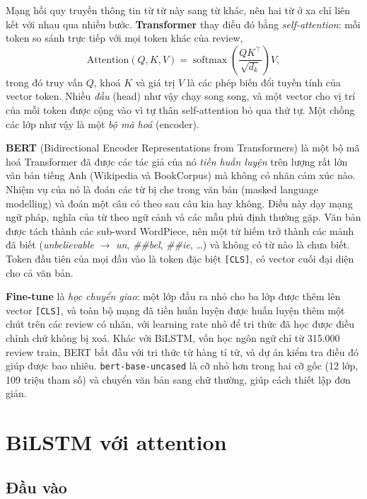 Mạng hồi quy truyền thông tin từ từ này sang từ khác, nên hai từ ở xa chỉ liên kết với nhau qua nhiều bước. \textbf{Transformer} thay điều đó bằng \emph{self-attention}: mỗi token so sánh trực tiếp với mọi token khác của review,
\begin{equation*}
    \text{Attention}(Q,K,V)=\operatorname{softmax}\!\left(\frac{QK^\top}{\sqrt{d_k}}\right)V,
\end{equation*}
trong đó truy vấn $Q$, khoá $K$ và giá trị $V$ là các phép biến đổi tuyến tính của vector token. Nhiều \emph{đầu} (head) như vậy chạy song song, và một vector cho vị trí của mỗi token được cộng vào vì tự thân self-attention bỏ qua thứ tự. Một chồng các lớp như vậy là một \emph{bộ mã hoá} (encoder).

\textbf{BERT} (Bidirectional Encoder Representations from Transformers) là một bộ mã hoá Transformer đã được các tác giả của nó \emph{tiền huấn luyện} trên lượng rất lớn văn bản tiếng Anh (Wikipedia và BookCorpus) mà không có nhãn cảm xúc nào. Nhiệm vụ của nó là đoán các từ bị che trong văn bản (masked language modelling) và đoán một câu có theo sau câu kia hay không. Điều này dạy mạng ngữ pháp, nghĩa của từ theo ngữ cảnh và các mẫu phủ định thường gặp. Văn bản được tách thành các sub-word WordPiece, nên một từ hiếm trở thành các mảnh đã biết (\emph{unbelievable} $\to$ \emph{un}, \emph{\#\#bel}, \emph{\#\#ie}, \ldots) và không có từ nào là chưa biết. Token đầu tiên của mọi đầu vào là token đặc biệt \texttt{[CLS]}, có vector cuối đại diện cho cả văn bản.

\textbf{Fine-tune} là \emph{học chuyển giao}: một lớp đầu ra nhỏ cho ba lớp được thêm lên vector \texttt{[CLS]}, và toàn bộ mạng đã tiền huấn luyện được huấn luyện thêm một chút trên các review có nhãn, với learning rate nhỏ để tri thức đã học được điều chỉnh chứ không bị xoá. Khác với BiLSTM, vốn học ngôn ngữ chỉ từ 315.000 review train, BERT bắt đầu với tri thức từ hàng tỉ từ, và dự án kiểm tra điều đó giúp được bao nhiêu. \texttt{bert-base-uncased} là cỡ nhỏ hơn trong hai cỡ gốc (12 lớp, 109 triệu tham số) và chuyển văn bản sang chữ thường, giúp cách thiết lập đơn giản.

\section{BiLSTM với attention}
\label{sec:6-3}

\subsection*{Đầu vào}

